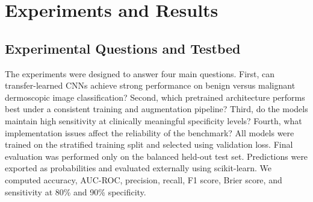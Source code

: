 \documentclass{article}
\begin{document}
\section{Experiments and Results}
\subsection{Experimental Questions and Testbed}
The experiments were designed to answer four main questions. First, can transfer-learned CNNs
achieve strong performance on benign versus malignant dermoscopic image classification? Second,
which pretrained architecture performs best under a consistent training and augmentation pipeline?
Third, do the models maintain high sensitivity at clinically meaningful specificity levels? Fourth,
what implementation issues affect the reliability of the benchmark?
All models were trained on the stratified training split and selected using validation loss. Final
evaluation was performed only on the balanced held-out test set. Predictions were exported as
probabilities and evaluated externally using scikit-learn. We computed accuracy, AUC-ROC,
precision, recall, F1 score, Brier score, and sensitivity at 80\% and 90\% specificity.
\end{document}
